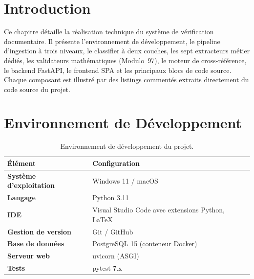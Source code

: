
\section*{Introduction}

Ce chapitre d\'{e}taille la r\'{e}alisation technique du syst\`{e}me de v\'{e}rification documentaire. Il pr\'{e}sente l'environnement de d\'{e}veloppement, le pipeline d'ingestion \`{a} trois niveaux, le classifier \`{a} deux couches, les sept extracteurs m\'{e}tier d\'{e}di\'{e}s, les validateurs math\'{e}matiques (Modulo~97), le moteur de cross-r\'{e}f\'{e}rence, le backend FastAPI, le frontend SPA et les principaux blocs de code source. Chaque composant est illustr\'{e} par des listings comment\'{e}s extraits directement du code source du projet.

\section{Environnement de D\'{e}veloppement}

\begin{table}[H]
\centering
\small
\begin{tabularx}{\textwidth}{@{}>{\bfseries}p{3.5cm} Y@{}}
\toprule
{}
\'{E}l\'{e}ment & Configuration \\
\midrule
Syst\`{e}me d'exploitation & Windows 11 / macOS \\
Langage & Python 3.11 \\
IDE & Visual Studio Code avec extensions Python, LaTeX \\
Gestion de version & Git / GitHub \\
Base de donn\'{e}es & PostgreSQL 15 (conteneur Docker) \\
Serveur web & uvicorn (ASGI) \\
Tests & pytest 7.x \\
\bottomrule
\end{tabularx}
\caption{Environnement de d\'{e}veloppement du projet.}
\label{tab:environnement-dev}
\end{table}

